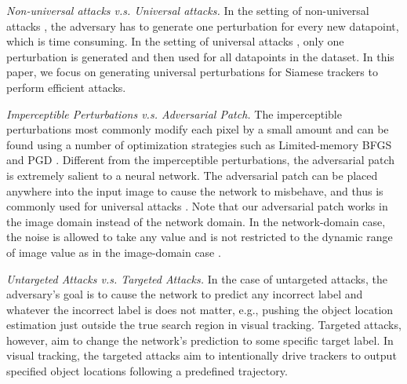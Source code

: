\documentclass[journal]{IEEEtran}
\newcommand{\eg}{e.g.}
\renewcommand{\uline}{}
\begin{document}
\textit{Non-universal attacks v.s. Universal attacks\uline{.}} In the setting of non-universal attacks \cite{dai2018adversarial,li2018second,lin2017tactics}, the adversary has to generate one perturbation for every new datapoint, which is time consuming. In the setting of universal attacks \cite{khrulkov2018art,mopuri2018nag,zhang2020understanding,mopuri2018generalizable,chen2018shapeshifter}, only one perturbation is generated and \uline{then} used for \uline{all datapoints in} the dataset. In this paper, we focus on generating universal perturbations for Siamese trackers to perform efficient attacks.

\textit{Imperceptible Perturbations v.s. Adversarial Patch\uline{.}} The imperceptible perturbations most commonly modify each pixel by a small amount and can be found using a number of optimization strategies such as Limited-memory BFGS \cite{intriguing} and PGD \cite{PGD}. Different from the imperceptible perturbations, the adversarial patch is extremely salient to a neural network. The adversarial patch can be placed anywhere into the input image to cause the network to misbehave, and thus is commonly used for universal attacks \cite{patch}. Note that our adversarial patch works in the image domain instead of the network domain. In the network-domain case, the noise is allowed to take any value and is not restricted to the dynamic range of image value as in the image-domain case \cite{karmon2018lavan}.

\textit{Untargeted Attacks v.s. Targeted Attacks\uline{.}} In the case of untargeted attacks, the adversary's goal is to cause the network to predict any incorrect label and whatever the incorrect label is does not matter, \eg, pushing the object location estimation just outside the true search region in visual tracking. Targeted attacks, however, aim to change the network's prediction to some specific target label. In visual tracking, the targeted attacks aim to intentionally drive trackers to output specified object locations following a predefined trajectory.
\vspace{-2mm}
\end{document}

